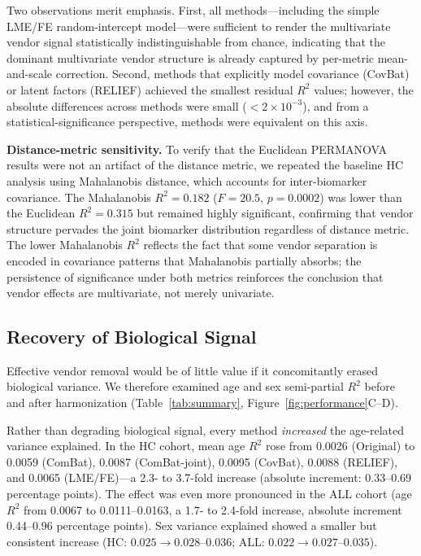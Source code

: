 \documentclass[12pt,a4paper]{article}
\begin{document}
Two observations merit emphasis. First, all methods---including the simple LME/FE random-intercept model---were sufficient to render the multivariate vendor signal statistically indistinguishable from chance, indicating that the dominant multivariate vendor structure is already captured by per-metric mean-and-scale correction. Second, methods that explicitly model covariance (CovBat) or latent factors (RELIEF) achieved the smallest residual $R^2$ values; however, the absolute differences across methods were small ($<2 \times 10^{-3}$), and from a statistical-significance perspective, methods were equivalent on this axis.

\textbf{Distance-metric sensitivity.} To verify that the Euclidean PERMANOVA results were not an artifact of the distance metric, we repeated the baseline HC analysis using Mahalanobis distance, which accounts for inter-biomarker covariance. The Mahalanobis $R^2 = 0.182$ ($F = 20.5$, $p = 0.0002$) was lower than the Euclidean $R^2 = 0.315$ but remained highly significant, confirming that vendor structure pervades the joint biomarker distribution regardless of distance metric. The lower Mahalanobis $R^2$ reflects the fact that some vendor separation is encoded in covariance patterns that Mahalanobis partially absorbs; the persistence of significance under both metrics reinforces the conclusion that vendor effects are multivariate, not merely univariate.

\subsection{Recovery of Biological Signal}

Effective vendor removal would be of little value if it concomitantly erased biological variance. We therefore examined age and sex semi-partial $R^2$ before and after harmonization (Table~\ref{tab:summary}, Figure~\ref{fig:performance}C--D).

Rather than degrading biological signal, every method \emph{increased} the age-related variance explained. In the HC cohort, mean age $R^2$ rose from 0.0026 (Original) to 0.0059 (ComBat), 0.0087 (ComBat-joint), 0.0095 (CovBat), 0.0088 (RELIEF), and 0.0065 (LME/FE)---a 2.3- to 3.7-fold increase (absolute increment: 0.33--0.69 percentage points). The effect was even more pronounced in the ALL cohort (age $R^2$ from 0.0067 to 0.0111--0.0163, a 1.7- to 2.4-fold increase, absolute increment 0.44--0.96 percentage points). Sex variance explained showed a smaller but consistent increase (HC: $0.025 \rightarrow 0.028$--$0.036$; ALL: $0.022 \rightarrow 0.027$--$0.035$).
\end{document}
